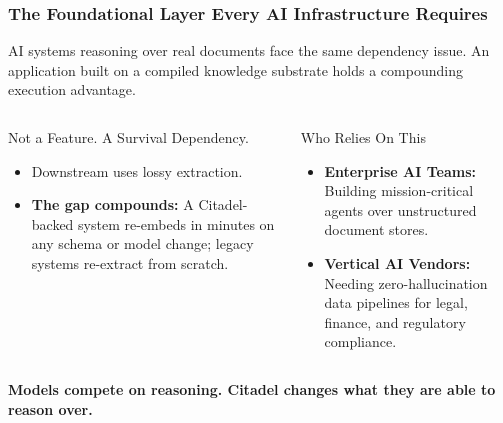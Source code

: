\documentclass[aspectratio=169,11pt]{beamer}
\begin{document}
	\begin{frame}
		\frametitle{The Foundational Layer Every AI Infrastructure Requires}
		AI systems reasoning over real documents face the same dependency issue. An application built on a compiled knowledge substrate holds a compounding execution advantage.

		\begin{columns}[T]
			\begin{block}{Not a Feature. A Survival Dependency.}
				\begin{itemize}
					\item Downstream uses lossy extraction.
					\item \textbf{The gap compounds:} A Citadel-backed system re-embeds in minutes on any schema or model change; legacy systems re-extract from scratch.
				\end{itemize}
			\end{block}

			\begin{block}{Who Relies On This}
				\begin{itemize}
					\item \textbf{Enterprise AI Teams:} Building mission-critical agents over unstructured document stores.
					\item \textbf{Vertical AI Vendors:} Needing zero-hallucination data pipelines for legal, finance, and regulatory compliance.
				\end{itemize}
			\end{block}
		\end{columns}
		\vfill
		\centering
		{\color{CitadelHighlight}\bfseries Models compete on reasoning. Citadel changes what they are able to reason over.}
	\end{frame}
\end{document}

